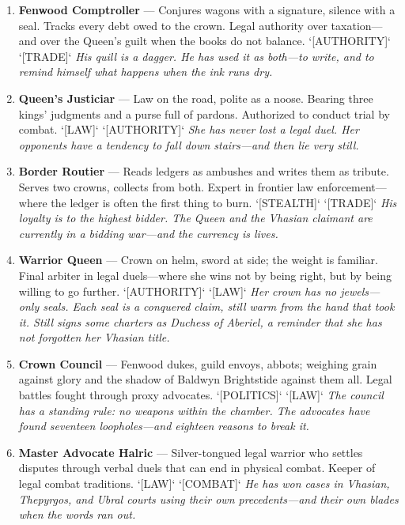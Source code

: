 \begin{enumerate}
  \hfill \textit{Her skiff has no name. The customs clerks have given it three---and each one is a different kind of truth.}
\item \textbf{Fenwood Comptroller} --- Conjures wagons with a signature, silence with a seal. Tracks every debt owed to the crown. Legal authority over taxation---and over the Queen's guilt when the books do not balance. `[AUTHORITY]` `[TRADE]`
  \hfill \textit{His quill is a dagger. He has used it as both---to write, and to remind himself what happens when the ink runs dry.}
\item \textbf{Queen's Justiciar} --- Law on the road, polite as a noose. Bearing three kings' judgments and a purse full of pardons. Authorized to conduct trial by combat. `[LAW]` `[AUTHORITY]`
  \hfill \textit{She has never lost a legal duel. Her opponents have a tendency to fall down stairs---and then lie very still.}
\item[J] \textbf{Border Routier} --- Reads ledgers as ambushes and writes them as tribute. Serves two crowns, collects from both. Expert in frontier law enforcement---where the ledger is often the first thing to burn. `[STEALTH]` `[TRADE]`
  \hfill \textit{His loyalty is to the highest bidder. The Queen and the Vhasian claimant are currently in a bidding war---and the currency is lives.}
\item[Q] \textbf{Warrior Queen} --- Crown on helm, sword at side; the weight is familiar. Final arbiter in legal duels---where she wins not by being right, but by being willing to go further. `[AUTHORITY]` `[LAW]`
  \hfill \textit{Her crown has no jewels---only seals. Each seal is a conquered claim, still warm from the hand that took it. Still signs some charters as Duchess of Aberiel, a reminder that she has not forgotten her Vhasian title.}
\item[K] \textbf{Crown Council} --- Fenwood dukes, guild envoys, abbots; weighing grain against glory and the shadow of Baldwyn Brightstide against them all. Legal battles fought through proxy advocates. `[POLITICS]` `[LAW]`
  \hfill \textit{The council has a standing rule: no weapons within the chamber. The advocates have found seventeen loopholes---and eighteen reasons to break it.}
\item[A] \textbf{Master Advocate Halric} --- Silver-tongued legal warrior who settles disputes through verbal duels that can end in physical combat. Keeper of legal combat traditions. `[LAW]` `[COMBAT]`
  \hfill \textit{He has won cases in Vhasian, Thepyrgos, and Ubral courts using their own precedents---and their own blades when the words ran out.}
\end{enumerate}

